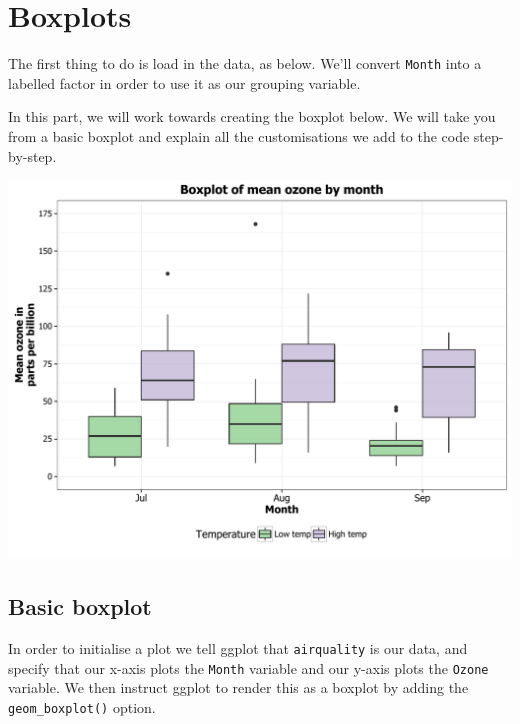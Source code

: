 \chapter{Boxplots}\label{boxplots}

The first thing to do is load in the data, as below. We'll convert
\texttt{Month} into a labelled factor in order to use it as our grouping
variable.

\begin{Shaded}
\begin{Highlighting}[]
\NormalTok{(} \NormalTok{())}

\StringTok{ }
\StringTok{       } \NormalTok{(}\NormalTok{, }\NormalTok{, }\NormalTok{, }\NormalTok{, }\NormalTok{))}
\end{Highlighting}
\end{Shaded}

In this part, we will work towards creating the boxplot below. We will
take you from a basic boxplot and explain all the customisations we add
to the code step-by-step.

\begin{center}\includegraphics[width=0.55\linewidth]{figures/box_final-1} \end{center}

\section{Basic boxplot}\label{basic-boxplot}

In order to initialise a plot we tell ggplot that \texttt{airquality} is
our data, and specify that our x-axis plots the \texttt{Month} variable
and our y-axis plots the \texttt{Ozone} variable. We then instruct
ggplot to render this as a boxplot by adding the
\texttt{geom\_boxplot()} option.

